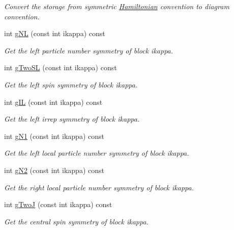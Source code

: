 \begin{DoxyCompactItemize}
\begin{DoxyCompactList}\small\item\em Convert the storage from symmetric \hyperlink{classCheMPS2_1_1Hamiltonian}{Hamiltonian} convention to diagram convention. \end{DoxyCompactList}\item 
int \hyperlink{classCheMPS2_1_1Sobject_a2b8ca2eaecfc448c0f0591462c8edede}{g\-N\-L} (const int ikappa) const 
\begin{DoxyCompactList}\small\item\em Get the left particle number symmetry of block ikappa. \end{DoxyCompactList}\item 
int \hyperlink{classCheMPS2_1_1Sobject_ae33e692d6e5f89d446f62515a85f725f}{g\-Two\-S\-L} (const int ikappa) const 
\begin{DoxyCompactList}\small\item\em Get the left spin symmetry of block ikappa. \end{DoxyCompactList}\item 
int \hyperlink{classCheMPS2_1_1Sobject_a77be4052f1655e2f8fecee8f231bc209}{g\-I\-L} (const int ikappa) const 
\begin{DoxyCompactList}\small\item\em Get the left irrep symmetry of block ikappa. \end{DoxyCompactList}\item 
int \hyperlink{classCheMPS2_1_1Sobject_ae27c30606eb0f3f1eb9a32c559b7b209}{g\-N1} (const int ikappa) const 
\begin{DoxyCompactList}\small\item\em Get the left local particle number symmetry of block ikappa. \end{DoxyCompactList}\item 
int \hyperlink{classCheMPS2_1_1Sobject_a62923e0b950298fe42017dcdeadcfb03}{g\-N2} (const int ikappa) const 
\begin{DoxyCompactList}\small\item\em Get the right local particle number symmetry of block ikappa. \end{DoxyCompactList}\item 
int \hyperlink{classCheMPS2_1_1Sobject_a2bf86bc7861704b1f2ddb655312da82b}{g\-Two\-J} (const int ikappa) const 
\begin{DoxyCompactList}\small\item\em Get the central spin symmetry of block ikappa. \end{DoxyCompactList}\item 

\end{DoxyCompactItemize}
